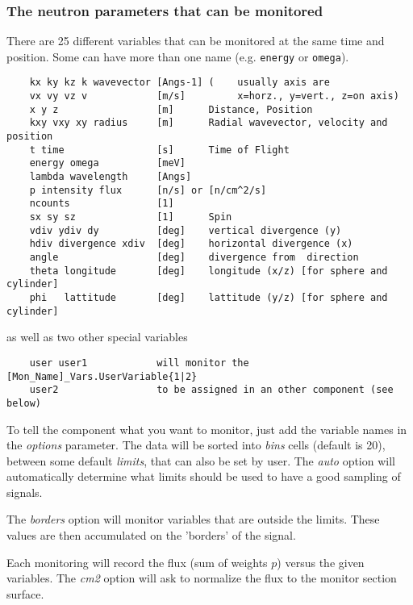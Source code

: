 \subsubsection{The neutron parameters that can be monitored}

There are 25 different variables that can be monitored at the same time
and position. Some can have more than one name (e.g. \texttt{energy} or
\texttt{omega}).


\begin{verbatim}
    kx ky kz k wavevector [Angs-1] (    usually axis are
    vx vy vz v            [m/s]         x=horz., y=vert., z=on axis)
    x y z                 [m]      Distance, Position
    kxy vxy xy radius     [m]      Radial wavevector, velocity and position
    t time                [s]      Time of Flight
    energy omega          [meV]
    lambda wavelength     [Angs]
    p intensity flux      [n/s] or [n/cm^2/s]
    ncounts               [1]
    sx sy sz              [1]      Spin
    vdiv ydiv dy          [deg]    vertical divergence (y)
    hdiv divergence xdiv  [deg]    horizontal divergence (x)
    angle                 [deg]    divergence from  direction
    theta longitude       [deg]    longitude (x/z) [for sphere and cylinder]
    phi   lattitude       [deg]    lattitude (y/z) [for sphere and cylinder]
\end{verbatim}
as well as two other special variables
\begin{verbatim}
    user user1            will monitor the [Mon_Name]_Vars.UserVariable{1|2}
    user2                 to be assigned in an other component (see below)
\end{verbatim}

To tell the component what you want to monitor, just add the variable
names in the {\it options} parameter. The data will be sorted into {\it
  bins} cells (default is 20), between some default {\it limits}, that
can also be set by user. The {\it auto} option will automatically
determine what limits should be used to have a good sampling of signals.

The {\it borders} option will monitor variables that are outside
the limits. These values are then accumulated on the 'borders' of the
signal.

Each monitoring will record the flux (sum of weights $p$) versus the
given variables. The {\it cm2} option will ask to normalize the flux
to the monitor section surface.

